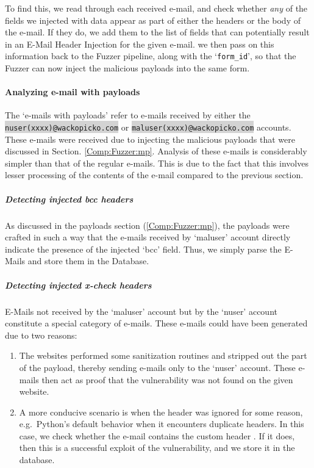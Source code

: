 To find this, we read through each received e-mail, and check whether \emph{any} of the fields we injected with data appear as part of either the headers or the body of the e-mail. If they do, we add them to the list of fields that can potentially result in an E-Mail Header Injection for the given e-mail. we then pass on this information back to the Fuzzer pipeline, along with the `\lstinline{form_id}', so that the Fuzzer can now inject the malicious payloads into the same form.

\paragraph{Analyzing e-mail with payloads}
The `e-mails with payloads' refer to e-mails received by either the \colorbox{lightgray}{\lstinline{nuser(xxxx)@wackopicko.com}} or \colorbox{lightgray}{\lstinline{maluser(xxxx)@wackopicko.com}} accounts. These e-mails were received due to injecting the malicious payloads that were discussed in Section. \ref{Comp:Fuzzer:mp}. Analysis of these e-mails is considerably simpler than that of the regular e-mails. This is due to the fact that this involves lesser processing of the contents of the e-mail compared to the previous section.
\subparagraph{Detecting injected bcc headers}
As discussed in the payloads section (\ref{Comp:Fuzzer:mp}), the payloads were crafted in such a way that the e-mails received by `maluser' account directly indicate the presence of the injected `bcc' field. Thus, we simply parse the E-Mails and store them in the Database.

\label{analyze:detect_x_check}
\subparagraph{Detecting injected x-check headers}
E-Mails not received by the `maluser' account but by the `nuser' account constitute a special category of e-mails.
These e-mails could have been generated due to two reasons:
\begin{enumerate}
	\item The websites performed some sanitization routines and stripped out the  part of the payload, thereby sending e-mails only to the `nuser' account. These e-mails then act as proof that the vulnerability was not found on the given website.
	\item A more conducive scenario is when the  header was ignored for some reason, e.g.\ Python's default behavior when it encounters duplicate headers. In this case, we check whether the e-mail contains the custom header . If it does, then this is a successful exploit of the vulnerability, and we store it in the database.
\end{enumerate}
